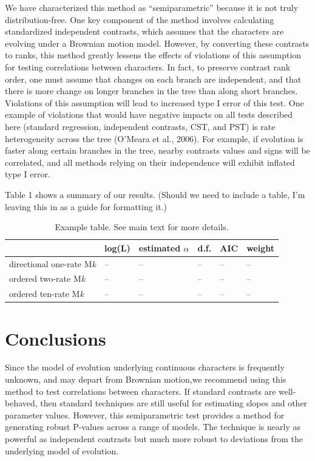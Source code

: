 \documentclass[fleqn,10pt,lineno]{wlpeerj} %
\begin{document}
We have characterized this method as ``semiparametric'' because it is not truly distribution-free. One key component of the method involves calculating standardized independent contrasts, which assumes that the characters are evolving under a Brownian motion model. However, by converting these contrasts to ranks, this method greatly lessens the effects of violations of this assumption for testing correlations between characters. In fact, to preserve contrast rank order, one must assume that changes on each branch are independent, and that there is more change on longer branches in the tree than along short branches. Violations of this assumption will lead to increased type I error of this test. One example of violations that would have negative impacts on all tests described here (standard regression, independent contrasts, CST, and PST) is rate heterogeneity across the tree (O'Meara et al., 2006). For example, if evolution is faster along certain branches in the tree, nearby contrasts values and signs will be correlated, and all methods relying on their independence will exhibit inflated type I error.

Table 1 shows a summary of our results. (Should we need to include a table, I'm leaving this in as a guide for formatting it.)

\begin{table}

\caption{\label{tab:unnamed-chunk-6}Example table. See main text for more details.}
\centering
\begin{tabular}[t]{l|l|l|l|l|l}
\hline
  & log(L) & estimated $\alpha$ & d.f. & AIC & weight\\
\hline
directional one-rate M\emph{k} & -- & -- & -- & -- & --\\
\hline
ordered two-rate M\emph{k} & -- & -- & -- & -- & --\\
\hline
ordered ten-rate M\emph{k} & -- & -- & -- & -- & --\\
\hline
\end{tabular}
\end{table}

\section{Conclusions}\label{conclusions}

Since the model of evolution underlying continuous characters is frequently unknown, and may depart from Brownian motion,we recommend using this method to test correlations between characters. If standard contrasts are well-behaved, then standard techniques are still useful for estimating slopes and other parameter values. However, this semiparametric test provides a method for generating robust P-values across a range of models. The technique is nearly as powerful as independent contrasts but much more robust to deviations from the underlying model of evolution.
\end{document}
